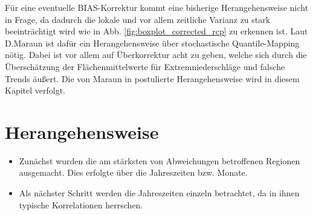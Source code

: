 Für eine eventuelle BIAS-Korrektur kommt eine bisherige Herangehensweise nicht in Frage, da dadurch die lokale und vor allem zeitliche Varianz zu stark beeinträchtigt wird wie in Abb. \ref{fig:boxplot_corrected_rcp} zu erkennen ist. Laut D.Maraun \cite{biasMaraun} ist dafür ein Herangehensweise über stochastische Quantile-Mapping nötig. Dabei ist vor allem auf Überkorrektur acht zu geben, welche sich durch die Überschätzung der Flächenmittelwerte für Extremniederschläge und falsche Trends äußert. Die von Maraun in \cite{biasMaraun} postulierte Herangehensweise wird in diesem Kapitel verfolgt.
\section{Herangehensweise}
\begin{itemize}
	\item Zunächst wurden die am stärksten von Abweichungen betroffenen Regionen ausgemacht. Dies erfolgte über die Jahreszeiten bzw. Monate.
	\item Als nächster Schritt werden die Jahreszeiten einzeln betrachtet, da in ihnen typische Korrelationen herrschen.
\end{itemize}


